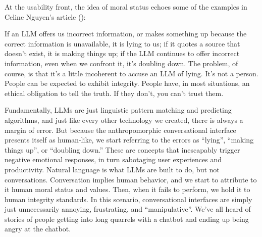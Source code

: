 \documentclass[12pt]{article}
\begin{document}
At the usability front, the idea of moral status echoes some of the examples in Celine Nguyen's article (\cite{moral}):
\begin{displayquote}
If an LLM offers us incorrect information, or makes something up because the correct information is unavailable, it is lying to us; if it quotes a source that doesn't exist, it is making things up; if the LLM continues to offer incorrect information, even when we confront it, it's doubling down. The problem, of course, is that it's a little incoherent to accuse an LLM of lying. It's not a person. People can be expected to exhibit integrity. People have, in most situations, an ethical obligation to tell the truth. If they don't, you can't trust them.
\end{displayquote}
Fundamentally, LLMs are just linguistic pattern matching and predicting algorithms, and just like every other technology we created, there is always a margin of error. But because the anthropomorphic conversational interface presents itself as human-like, we start referring to the errors as ``lying'', ``making things up'', or ``doubling down.'' These are concepts that inescapably trigger negative emotional responses, in turn sabotaging user experiences and productivity. Natural language is what LLMs are built to do, but not conversations. Conversation implies human behavior, and we start to attribute to it human moral status and values. Then, when it fails to perform, we hold it to human integrity standards. In this scenario, conversational interfaces are simply just unnecessarily annoying, frustrating, and ``manipulative''. We've all heard of stories of people getting into long quarrels with a chatbot and ending up being angry at the chatbot.
\end{document}
